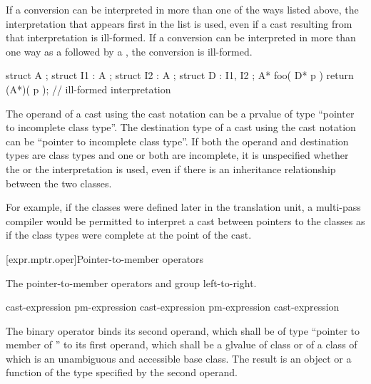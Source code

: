 If a conversion can be interpreted in more than one of the ways listed
above, the interpretation that appears first in the list is used, even
if a cast resulting from that interpretation is ill-formed. If a
conversion can be interpreted in more than one way as a
 followed by a , the conversion is
ill-formed.
\begin{example}
\begin{codeblock}
struct A { };
struct I1 : A { };
struct I2 : A { };
struct D : I1, I2 { };
A* foo( D* p ) {
  return (A*)( p );             // ill-formed  interpretation
}
\end{codeblock}
\end{example}

\pnum
{}%
The operand of a cast using the cast notation can be a prvalue of type
``pointer to incomplete class type''. The destination type of a cast
using the cast notation can be ``pointer to incomplete class type''. If
both the operand and destination types are class types and one or both
are incomplete, it is unspecified whether the  or the
 interpretation is used, even if there is an
inheritance relationship between the two classes.
\begin{note}
For example, if the classes were defined later in the translation unit,
a multi-pass compiler would be permitted to interpret a cast between
pointers to the classes as if the class types were complete at the point
of the cast.
\end{note}

[expr.mptr.oper]{Pointer-to-member operators}

\pnum
{}%
%
%
%
%
%
The pointer-to-member operators \tcode{->*} and  group
left-to-right.

\begin{bnf}
\br
    cast-expression\br
    pm-expression  cast-expression\br
    pm-expression \terminal{->*} cast-expression
\end{bnf}

\pnum
The binary operator  binds its second operand, which shall be
of type ``pointer to member of '' to its first operand, which shall be
a glvalue
of
class  or of a class of which  is an unambiguous and
accessible base class. The result is an object or a function of the type
specified by the second operand.

